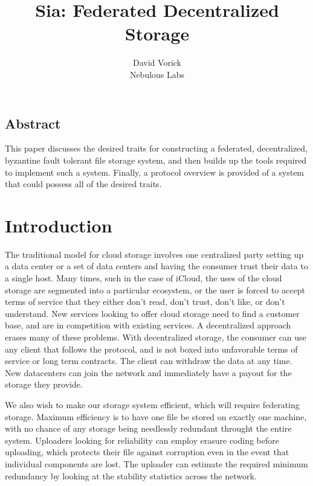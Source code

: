 \documentclass[twocolumn]{article}
\begin{document}
\frenchspacing

\title{Sia: Federated Decentralized Storage}

\author{
{\rm David Vorick}\\
Nebulous Labs
}

\maketitle

\subsection*{Abstract}
This paper discusses the desired traits for constructing a federated, decentralized, byzantine fault tolerant file storage system, and then builds up the tools required to implement such a system. Finally, a protocol overview is provided of a system that could possess all of the desired traits.

\section{Introduction}
The traditional model for cloud storage involves one centralized party setting up a data center or a set of data centers and having the consumer trust their data to a single host.
Many times, such in the case of iCloud, the uses of the cloud storage are segmented into a particular ecosystem, or the user is forced to accept terms of service that they either don't read, don't trust, don't like, or don't understand.
New services looking to offer cloud storage need to find a customer base, and are in competition with existing services.
A decentralized approach erases many of these problems.
With decentralized storage, the consumer can use any client that follows the protocol, and is not boxed into unfavorable terms of service or long term contracts.
The client can withdraw the data at any time.
New datacenters can join the network and immediately have a payout for the storage they provide.

We also wish to make our storage system efficient, which will require federating storage.
Maximum efficiency is to have one file be stored on exactly one machine, with no chance of any storage being needlessly redundant throught the entire system.
Uploaders looking for reliability can employ erasure coding before uploading, which protects their file against corruption even in the event that individual components are lost.
The uploader can estimate the required minimum redundancy by looking at the stability statistics across the network.
\end{document}

